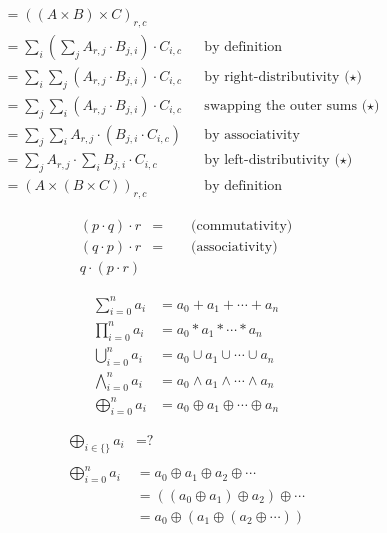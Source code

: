 \documentclass{minimal}
\begin{document}
\begin{align*}
&= ((A \times B) \times C)_{r,c} \\
&= \sum_i \left( \sum_j A_{r,j} \cdot B_{j,i} \right) \cdot C_{i,c}
    && \text{by definition} \\
&= \sum_i \sum_j (A_{r,j} \cdot B_{j,i}) \cdot C_{i,c}
    && \text{by right-distributivity (⋆)} \\
&= \sum_j \sum_i (A_{r,j} \cdot B_{j,i}) \cdot C_{i,c}
    && \text{swapping the outer sums (⋆)} \\
&= \sum_j \sum_i A_{r,j} \cdot (B_{j,i} \cdot C_{i,c})
    && \text{by associativity} \\
&= \sum_j A_{r,j} \cdot \sum_i B_{j,i} \cdot C_{i,c}
    && \text{by left-distributivity (⋆)} \\
&= (A \times (B \times C))_{r,c}
    && \text{by definition}
\end{align*}

\begin{align*}
(p \cdot q) \cdot r &= \qquad\text{(commutativity)} \\
(q \cdot p) \cdot r &= \qquad\text{(associativity)} \\
q \cdot (p \cdot r)
\end{align*}

\begin{align*}
\sum_{i=0}^n a_i &= a_0 + a_1 + \cdots + a_n \\
\prod_{i=0}^n a_i &= a_0 * a_1 * \cdots * a_n \\
\bigcup_{i=0}^n a_i &= a_0 \cup a_1 \cup \cdots \cup a_n \\
\bigwedge_{i=0}^n a_i &= a_0 \wedge a_1 \wedge \cdots \wedge a_n \\
\bigoplus_{i=0}^n a_i &= a_0 \oplus a_1 \oplus \cdots \oplus a_n
\end{align*}

\begin{align*}
\bigoplus_{i \in \{\}} a_i &= \text{?} \\ \\
\bigoplus_{i=0}^n a_i &= a_0 \oplus a_1 \oplus a_2 \oplus \cdots \\
                      &= ((a_0 \oplus a_1) \oplus a_2) \oplus \cdots \\
                      &= a_0 \oplus (a_1 \oplus (a_2 \oplus \cdots))
\end{align*}
\end{document}

